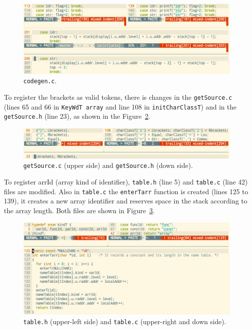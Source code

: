 \documentclass{article}
\begin{document}
\begin{figure}[h]
  \includegraphics[scale=0.35]{./img/Q4-3-2.png}
  \centering
  \caption{{\tt codegen.c}.}
  \label{fig:q432}
\end{figure}

To register the brackets as valid tokens, there is changes in the {\tt getSource.c} (lines 65 and 66 in {\tt KeyWdT array} and line 108 in {\tt initCharClassT}) and in the {\tt getSource.h} (line 23), as shown in the Figure~\ref{fig:q433}.\\

\begin{figure}[h]
  \includegraphics[scale=0.35]{./img/Q4-3-3.png}
  \centering
  \caption{{\tt getSource.c} (upper side) and {\tt getSource.h} (down side).}
  \label{fig:q433}
\end{figure}

To register arrId (array kind of identifier), {\tt table.h} (line 5) and {\tt table.c} (line 42) files are modified. Also in {\tt table.c} the {\tt enterTarr} function is created (lines 125 to 139), it creates a new array identifier and reserves space in the stack according to the array length. Both files are shown in Figure~\ref{fig:q434}.\\

\begin{figure}[h]
  \includegraphics[scale=0.35]{./img/Q4-3-4.png}
  \centering
  \caption{{\tt table.h} (upper-left side) and {\tt table.c} (upper-right and down side).}
  \label{fig:q434}
\end{figure}
\end{document}
